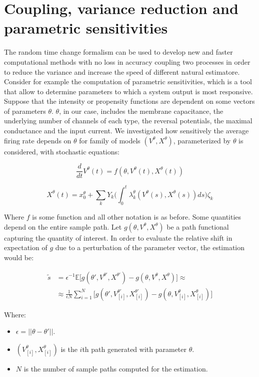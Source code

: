 \section{Coupling, variance reduction and parametric sensitivities}
The random time change formalism can be used to develop new and faster computational methods with no loss in accuracy coupling two processes in order to reduce the variance and increase the speed of different natural estimatore.
Consider for example the computation of parametric sensitivities, which is a tool that allow to determine parameters to which a system output is most responsive.
Suppose that the intensity or propensity functions are dependent on some vectors of parameters $\theta$.
$\theta$, in our case, includes the membrane capacitance, the underlying number of channels of each type, the reversal potentials, the maximal conductance and the input current. We investigated how sensitively the average firing rate depends on $\theta$ for family of models $(V^\theta, X^\theta)$, parameterized by $\theta$ is considered, with stochastic equations:

$$\frac{d}{dt}V^\theta(t) = f(\theta, V^\theta(t), X^\theta(t))$$

$$X^\theta(t) = x_0^\theta + \sum\limits_kY_k\biggl(\int_0^t\lambda_k^\theta(V^\theta(s), X^\theta(s))ds\biggr)\zeta_k$$

Where $f$ is some function and all other notation is as before.
Some quantities depend on the entire sample path.
Let $g(\theta, V^\theta, X^\theta)$ be a path functional capturing the quantity of interest.
In order to evaluate the relative shift in expectation of $g$ due to a perturbation of the parameter vector, the estimation would be:


\begin{align*}
	\tilde{s} &=\epsilon^{-1}\mathbb{E}\bigl[g(\theta', V^{\theta'}, X^{\theta'})-g(\theta, V^\theta, X^\theta)\bigr]\approx\\
						&\approx\frac{1}{\epsilon N}\sum\limits_{i=1}^N\bigl[g(\theta', V_{[i]}^{\theta'}, X_{[i]}^{\theta'})-g(\theta, V_{[i]}^\theta, X_{[i]}^\theta)\bigr]
\end{align*}

Where:

\begin{itemize}
	\item $\epsilon= ||\theta-\theta'||$.
	\item $(V_{[i]}^\theta, X_{[i]}^{\theta})$ is the $i$th path generated with parameter $\theta$.
	\item $N$ is the number of sample paths computed for the estimation.
\end{itemize}

